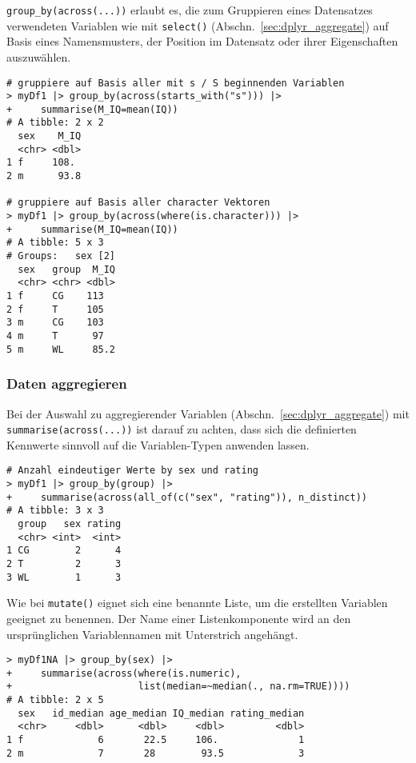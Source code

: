 \lstinline!group_by(across(...))! erlaubt es, die zum Gruppieren eines Datensatzes verwendeten Variablen wie mit \lstinline!select()! (Abschn.\ \ref{sec:dplyr_aggregate}) auf Basis eines Namensmusters, der Position im Datensatz oder ihrer Eigenschaften auszuwählen.
\begin{lstlisting}
# gruppiere auf Basis aller mit s / S beginnenden Variablen
> myDf1 |> group_by(across(starts_with("s"))) |>
+     summarise(M_IQ=mean(IQ))
# A tibble: 2 x 2
  sex    M_IQ
  <chr> <dbl>
1 f     108. 
2 m      93.8

# gruppiere auf Basis aller character Vektoren
> myDf1 |> group_by(across(where(is.character))) |>
+     summarise(M_IQ=mean(IQ))
# A tibble: 5 x 3
# Groups:   sex [2]
  sex   group  M_IQ
  <chr> <chr> <dbl>
1 f     CG    113  
2 f     T     105  
3 m     CG    103  
4 m     T      97  
5 m     WL     85.2
\end{lstlisting}

\subsubsection{Daten aggregieren}

Bei der Auswahl zu aggregierender Variablen (Abschn.\ \ref{sec:dplyr_aggregate}) mit \lstinline!summarise(across(...))! ist darauf zu achten, dass sich die definierten Kennwerte sinnvoll auf die Variablen-Typen anwenden lassen.
\begin{lstlisting}
# Anzahl eindeutiger Werte by sex und rating
> myDf1 |> group_by(group) |>
+     summarise(across(all_of(c("sex", "rating")), n_distinct))
# A tibble: 3 x 3
  group   sex rating
  <chr> <int>  <int>
1 CG        2      4
2 T         2      3
3 WL        1      3
\end{lstlisting}

Wie bei \lstinline!mutate()! eignet sich eine benannte Liste, um die erstellten Variablen geeignet zu benennen. Der Name einer Listenkomponente wird an den ursprünglichen Variablennamen mit Unterstrich angehängt.
\begin{lstlisting}
> myDf1NA |> group_by(sex) |>
+     summarise(across(where(is.numeric),
+                      list(median=~median(., na.rm=TRUE))))
# A tibble: 2 x 5
  sex   id_median age_median IQ_median rating_median
  <chr>     <dbl>      <dbl>     <dbl>         <dbl>
1 f             6       22.5     106.              1
2 m             7       28        93.5             3
\end{lstlisting}

